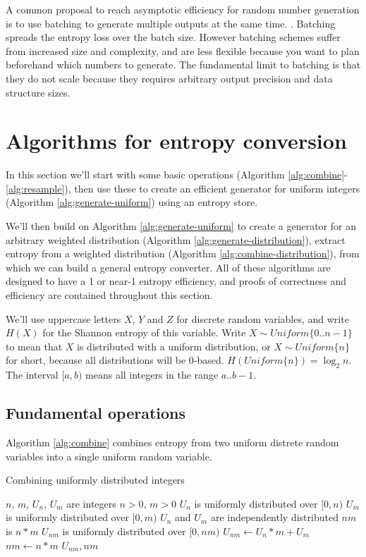 \documentclass[12pt]{article}
\begin{document}
A common proposal to reach asymptotic efficiency for random number generation is to use batching to generate multiple outputs at the same time. \cite{bacher2017,han97,devroye86,Knuth1976TheCO,lumbroso2013optimal}. Batching spreads the entropy loss over the batch size. However batching schemes suffer from increased size and complexity, and are less flexible because you want to plan beforehand which numbers to generate. The fundamental limit to batching is that they do not scale because they requires arbitrary output precision and data structure sizes.






\section{Algorithms for entropy conversion}

In this section we'll start with some basic operations (Algorithm \ref{alg:combine}-\ref{alg:resample}), then use these to create an efficient generator for uniform integers (Algorithm \ref{alg:generate-uniform}) using an entropy store.

We'll then build on Algorithm \ref{alg:generate-uniform} to create a generator for an arbitrary weighted distribution (Algorithm \ref{alg:generate-distribution}), extract entropy from a weighted distribution (Algorithm \ref{alg:combine-distribution}), from which we can build a general entropy converter. All of these algorithms are designed to have a 1 or near-1 entropy efficiency, and proofs of correctness and efficiency are contained throughout this section.

We'll use uppercase letters $X$, $Y$ and $Z$ for discrete random variables, and write $H(X)$ for the Shannon entropy of this variable. Write $X \sim Uniform\{0..n-1\}$ to mean that $X$ is distributed with a uniform distribution, or $X \sim Uniform\{n\}$ for short, because all distributions will be 0-based. $H(Uniform\{n\}) = \log_2n$. The interval $[a,b)$ means all integers in the range $a..b-1$.


\subsection{Fundamental operations}


Algorithm \ref{alg:combine} combines entropy from two uniform distrete random variables into a single uniform random variable.

\begin{algorithm}
\caption{Combining uniformly distributed integers}
\label{alg:combine}
\begin{algorithmic}[1]
    \Require $n$, $m$, $U_n$, $U_m$ are integers
    \Require $n>0$, $m>0$
    \Require $U_n$ is uniformly distributed over $[0,n)$
    \Require $U_m$ is uniformly distributed over $[0,m)$
    \Require $U_n$ and $U_m$ are independently distributed
    \Ensure $nm$ is $n * m$
    \Ensure $U_{nm}$ is uniformly distributed over $[0,nm)$
  \State $U_{nm} \gets U_n * m + U_m$
  \State $nm \gets n * m$
  \State \Return $U_{nm}, nm$
\EndProcedure
\end{algorithmic}
\end{algorithm}
\end{document}
